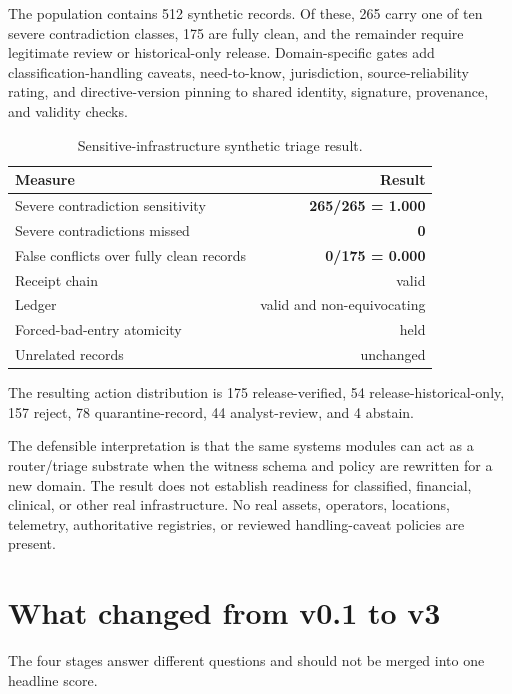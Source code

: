 \documentclass[11pt]{article}
\begin{document}
The population contains 512 synthetic records. Of these, 265 carry one of ten severe contradiction classes, 175 are fully clean, and the remainder require legitimate review or historical-only release. Domain-specific gates add classification-handling caveats, need-to-know, jurisdiction, source-reliability rating, and directive-version pinning to shared identity, signature, provenance, and validity checks.

\begin{table}[H]
\centering
\caption{Sensitive-infrastructure synthetic triage result.}
\begin{tabular}{lr}
\toprule
Measure & Result\\
\midrule
Severe contradiction sensitivity & \textbf{265/265 = 1.000}\\
Severe contradictions missed & \textbf{0}\\
False conflicts over fully clean records & \textbf{0/175 = 0.000}\\
Receipt chain & valid\\
Ledger & valid and non-equivocating\\
Forced-bad-entry atomicity & held\\
Unrelated records & unchanged\\
\bottomrule
\end{tabular}
\end{table}

The resulting action distribution is 175 release-verified, 54 release-historical-only, 157 reject, 78 quarantine-record, 44 analyst-review, and 4 abstain.

The defensible interpretation is that the same systems modules can act as a router/triage substrate when the witness schema and policy are rewritten for a new domain. The result does not establish readiness for classified, financial, clinical, or other real infrastructure. No real assets, operators, locations, telemetry, authoritative registries, or reviewed handling-caveat policies are present.
\section{What changed from v0.1 to v3}

The four stages answer different questions and should not be merged into one headline score.
\end{document}
